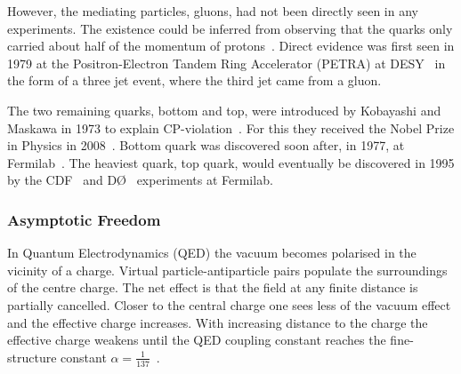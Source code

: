 However, the mediating particles, gluons, had not been directly seen in any experiments. The existence could be inferred from observing that the quarks only carried about half of the momentum of protons~\cite{25gluons}. Direct evidence was first seen in 1979 at the Positron-Electron Tandem Ring Accelerator (PETRA) at DESY~\cite{Brandelik:1979bd, PhysRev.43.830, Berger1979418} in the form of a three jet event, where the third jet came from a gluon.

The two remaining quarks, bottom and top, were introduced by Kobayashi and Maskawa in 1973 to explain CP-violation~\cite{Kobayashi:1973fv}. For this they received the Nobel Prize in Physics in 2008~\cite{Nobel2008}. Bottom quark was discovered soon after, in 1977, at Fermilab~\cite{Herb:1977ek}. The heaviest quark, top quark, would eventually be discovered in 1995 by the CDF~\cite{Abe:1995hr} and DØ~\cite{Abachi:1994td} experiments at Fermilab.




\subsubsection{Asymptotic Freedom}
In Quantum Electrodynamics (QED) the vacuum becomes polarised in the vicinity of a charge. Virtual particle-antiparticle pairs populate the surroundings of the centre charge.
The net effect is that the field at any finite distance is partially cancelled. Closer to the central charge one sees less of the vacuum effect and the effective charge increases. With increasing distance to the charge the effective charge weakens until the QED coupling constant reaches the fine-structure constant $\alpha=\frac{1}{137}$~\cite{Perkins:1982xb}.





